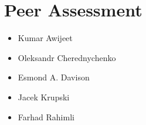 \section{Peer Assessment}

 \begin{itemize}
        \item Kumar Awijeet
		\item Oleksandr Cherednychenko
		\item Esmond A. Davison
		\item Jacek Krupski
		\item Farhad Rahimli
    \end{itemize}
